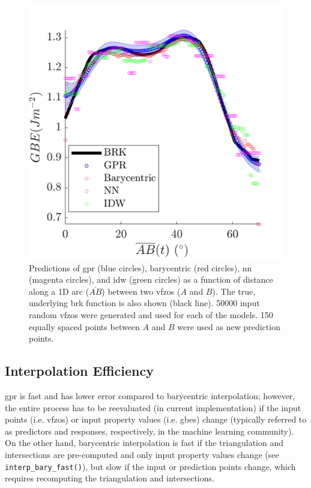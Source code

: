 \documentclass[final,twocolumn,12pt]{elsarticle}
\newcommand{\inpt}{input}
\newcommand{\outpt}{prediction}
\begin{document}
\begin{figure}
    \centering
    \includegraphics{figures/tunnel-50000.png}
    \caption{Predictions of \gls{gpr} (blue circles), barycentric (red circles), \gls{nn} (magenta circles), and \gls{idw} (green circles) as a function of distance along a 1D arc ($\overline{AB}$) between two \glspl{vfzo} ($A$ and $B$). The true, underlying \gls{brk} function is also shown (black line). \num{50000} \inpt{} random \glspl{vfzo} were generated and used for each of the models. \num{150} equally spaced points between $A$ and $B$ were used as new prediction points.}
    \label{fig:tunnel-50000}
\end{figure}

\subsection{Interpolation Efficiency}
\label{sec:results:efficiency}


\Gls{gpr} is fast and has lower error compared to barycentric interpolation; however, the entire process has to be reevaluated (in current implementation) if the input points (i.e. \glspl{vfzo}) or input property values (i.e. \glspl{gbe}) change
(typically referred to as predictors and responses, respectively, in the machine learning community).
On the other hand, barycentric interpolation is fast if the triangulation and intersections are pre-computed and only input property values change (see \texttt{interp\_bary\_fast()}), but slow if the \inpt{} or \outpt{} points change, which requires recomputing the triangulation and intersections.
\end{document}
